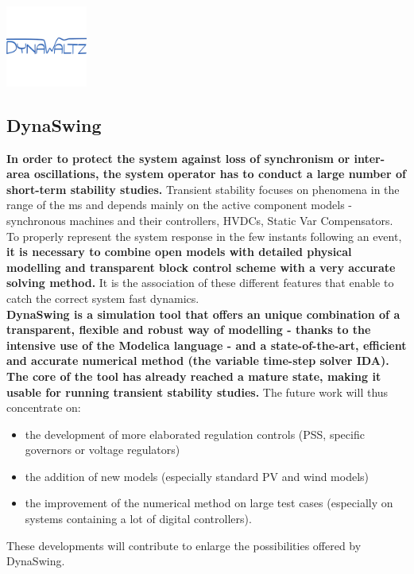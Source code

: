 \documentclass[a4paper, 12pt]{report}
\begin{document}
\begin{center}
\includegraphics[width=0.2\textwidth]{../resources/DynaWaltz.png}
\end{center}

\newpage
\subsection{DynaSwing}

\textbf{In order to protect the system against loss of synchronism or inter-area oscillations, the system operator has to conduct a large number of short-term stability studies. }Transient stability focuses on phenomena in the range of the ms and depends mainly on the active component models - synchronous machines and their controllers, HVDCs, Static Var Compensators. \\

To properly represent the system response in the few instants following an event, \textbf{it is necessary to combine open models with detailed physical modelling and transparent block control scheme with a very accurate solving method.} It is the association of these different features that enable to catch the correct system fast dynamics. \\

\textbf{DynaSwing is a simulation tool that offers an unique combination of a transparent, flexible and robust way of modelling - thanks to the intensive use of the Modelica language - and a state-of-the-art, efficient and accurate numerical method (the variable time-step solver IDA).} \\

\textbf{The core of the tool has already reached a mature state, making it usable for running transient stability studies.} The future work will thus concentrate on:
\begin{itemize}
\item the development of more elaborated regulation controls (PSS, specific governors or voltage regulators)
\item the addition of new models (especially standard PV and wind models)
\item the improvement of the numerical method on large test cases (especially on systems containing a lot of digital controllers).
\end{itemize}
These developments will contribute to enlarge the possibilities offered by DynaSwing.
\end{document}
